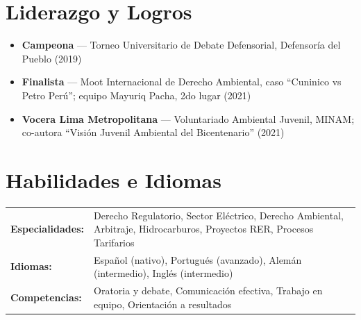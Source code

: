 \documentclass[10pt,letterpaper]{article}
\begin{document}
\section{Liderazgo y Logros}

\begin{itemize}
  \item \textbf{Campeona} --- Torneo Universitario de Debate Defensorial, Defensor\'ia del Pueblo (2019)
  \item \textbf{Finalista} --- Moot Internacional de Derecho Ambiental, caso ``Cuninico vs Petro Per\'u''; equipo Mayuriq Pacha, 2do lugar (2021)
  \item \textbf{Vocera Lima Metropolitana} --- Voluntariado Ambiental Juvenil, MINAM; co-autora ``Visi\'on Juvenil Ambiental del Bicentenario'' (2021)
\end{itemize}
\vspace{0.2em}

\section{Habilidades e Idiomas}

\begin{tabularx}{\textwidth}{@{}l X@{}}
\textbf{Especialidades:} & Derecho Regulatorio, Sector El\'ectrico, Derecho Ambiental, Arbitraje, Hidrocarburos, Proyectos RER, Procesos Tarifarios \\[2pt]
\textbf{Idiomas:} & Espa\~nol (nativo), Portugu\'es (avanzado), Alem\'an (intermedio), Ingl\'es (intermedio) \\[2pt]
\textbf{Competencias:} & Oratoria y debate, Comunicaci\'on efectiva, Trabajo en equipo, Orientaci\'on a resultados \\
\end{tabularx}
\end{document}
